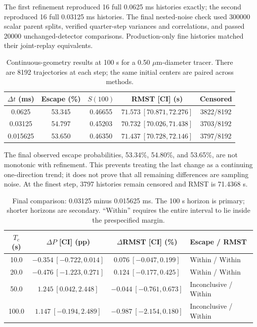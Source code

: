 \documentclass[a4paper,10pt]{article}
\numberwithin{equation}{section}
\begin{document}
The first refinement reproduced 16 full 0.0625 ms histories exactly; the second reproduced 16 full 0.03125 ms histories. The final nested-noise check used 300000 scalar parent splits, verified quarter-step variances and correlations, and passed 20000 unchanged-detector comparisons. Production-only fine histories matched their joint-replay equivalents.

\begin{table}[!htbp]
\centering\small
\setlength{\tabcolsep}{4pt}
\caption{Continuous-geometry results at 100 s for a 0.50 $\mu$m-diameter tracer. There are 8192 trajectories at each step; the same initial centers are paired across methods.}\label{tab:final-summary}
\begin{tabular}{@{}ccccc@{}}
\toprule
$\Delta t$ (ms) & Escape (\%) & $S(100)$ & RMST [CI] (s) & Censored \\ \midrule
0.0625 & 53.345 & 0.46655 & $71.573\ [70.871,72.276]$ & 3822/8192 \\
0.03125 & 54.797 & 0.45203 & $70.732\ [70.026,71.438]$ & 3703/8192 \\
0.015625 & 53.650 & 0.46350 & $71.437\ [70.728,72.146]$ & 3797/8192 \\
\bottomrule
\end{tabular}
\end{table}

The final observed escape probabilities, 53.34\%, 54.80\%, and 53.65\%, are not monotonic with refinement. This prevents treating the last change as a continuing one-direction trend; it does not prove that all remaining differences are sampling noise. At the finest step, 3797 histories remain censored and RMST is 71.4368 s.

\begin{table}[!htbp]
\centering\small
\setlength{\tabcolsep}{4pt}
\caption{Final comparison: 0.03125 minus 0.015625 ms. The 100 s horizon is primary; shorter horizons are secondary. ``Within'' requires the entire interval to lie inside the prespecified margin.}\label{tab:final-comparison}
\begin{tabular}{@{}cccl@{}}
\toprule
$T_c$ (s) & $\Delta P$ [CI] (pp) & $\Delta$RMST [CI] (\%) & Escape / RMST \\ \midrule
10.0 & $-0.354\ [-0.722,0.014]$ & $0.076\ [-0.047,0.199]$ & Within / Within \\
20.0 & $-0.476\ [-1.223,0.271]$ & $0.124\ [-0.177,0.425]$ & Within / Within \\
50.0 & $1.245\ [0.042,2.448]$ & $-0.044\ [-0.761,0.673]$ & Inconclusive / Within \\
100.0 & $1.147\ [-0.194,2.489]$ & $-0.987\ [-2.154,0.180]$ & Inconclusive / Within \\
\bottomrule
\end{tabular}
\end{table}
\end{document}
